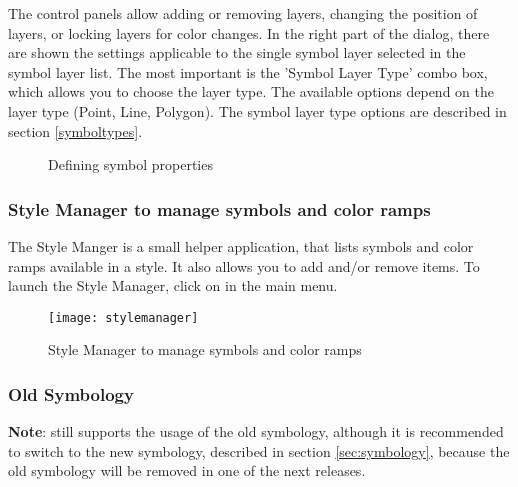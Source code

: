 The control panels allow adding or removing layers, changing the position of layers,
or locking layers for color changes. In the right part of the dialog, there are
shown the settings applicable to the single symbol layer selected in the symbol
layer list. The most important is the 'Symbol Layer Type' combo box, which allows
you to choose the layer type. The available options depend on the layer type
(Point, Line, Polygon). The symbol layer type options are described in section 
\ref{symboltypes}.


\begin{figure}[ht]
\centering
   \hspace{1cm}
   \hspace{1cm}
\caption{Defining symbol properties \nixcaption}
\end{figure}

\subsubsection{Style Manager to manage symbols and color ramps}\label{subsec:stylemanager}

The Style Manger is a small helper application, that lists symbols and color
ramps available in a style. It also allows you to add and/or remove items. To
launch the Style Manager, click on  \arrow {} in the main menu.

\begin{figure}[ht]
   \centering
   \texttt{[image: stylemanager]}
   \caption{Style Manager to manage symbols and color ramps \nixcaption}\label{fig:stylemanager}
\end{figure}

\subsubsection{Old Symbology}\label{sec:oldsymbology}

\textbf{Note}:  still supports the usage of the old symbology, although it is 
recommended to switch to the new symbology, described in section 
\ref{sec:symbology}, because the old symbology will be removed in one 
of the next releases.

